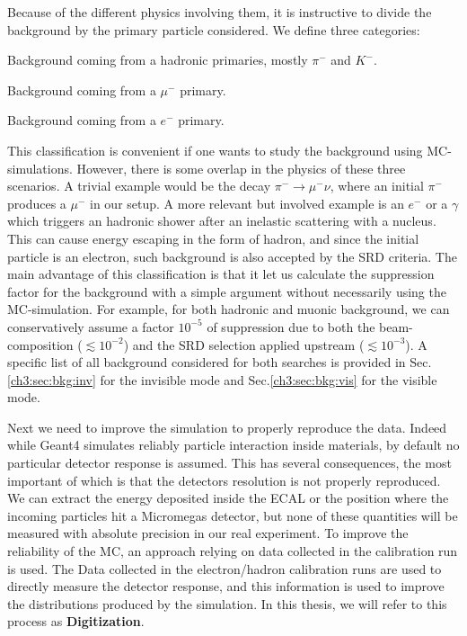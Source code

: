 Because of the different physics involving them, it is instructive to divide the background by the primary particle considered. We define three categories:

\begin{description}[leftmargin=!,labelwidth=\widthof{\bfseries Electronic background}]
\item[Hadronic background] Background coming from a hadronic primaries, mostly $\pi^-$ and $K^-$.
\item[Muonic background] Background coming from a $\mu^-$ primary.
\item[Electronic background] Background coming from a $e^-$ primary.
\end{description}

This classification is convenient if one wants to study the background using MC-simulations. However, there is some overlap in the physics of these three scenarios. A trivial example would be the decay $\pi^- \rightarrow \mu^-\nu$, where an initial $\pi^-$ produces a $\mu^-$ in our setup. A more relevant but involved example is an $e^-$ or a $\gamma$ which triggers an hadronic shower after an inelastic scattering with a nucleus. This can cause energy escaping in the form of hadron, and since the initial particle is an electron, such background is also accepted by the SRD criteria. The main advantage of this classification is that it let us calculate the suppression factor for the background with a simple argument without necessarily using the MC-simulation. For example, for both hadronic and muonic background, we can conservatively assume a factor $10^{-5}$ of suppression due to both the beam-composition ($\lesssim 10^{-2}$) and the SRD selection applied upstream ($\lesssim 10^{-3}$). A specific list of all background considered for both searches is provided in Sec.\ref{ch3:sec:bkg:inv} for the invisible mode and Sec.\ref{ch3:sec:bkg:vis} for the visible mode.

Next we need to improve the simulation to properly reproduce the data. Indeed while Geant4 simulates reliably particle interaction inside materials, by default no particular detector response is assumed. This has several consequences, the most important of which is that the detectors resolution is not properly reproduced. We can extract the energy deposited inside the ECAL or the position where the incoming particles hit a Micromegas detector, but none of these quantities will be measured with absolute precision in our real experiment. To improve the reliability of the MC, an approach relying on data collected in the calibration run is used. The Data collected in the electron/hadron calibration runs are used to directly measure the detector response, and this information is used to improve the distributions produced by the simulation. In this thesis, we will refer to this process as \textbf{Digitization}.

